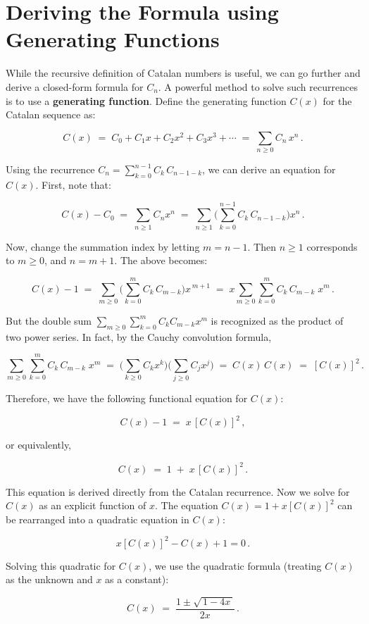 \documentclass[docmute]{article}
\begin{document}
\section{Deriving the Formula using Generating Functions}

While the recursive definition of Catalan numbers is useful, we can go further and derive a closed-form formula for $C_n$. A powerful method to solve such recurrences is to use a \textbf{generating function}. Define the generating function $C(x)$ for the Catalan sequence as:

\[
C(x) \;=\; C_0 + C_1 x + C_2 x^2 + C_3 x^3 + \cdots \;=\; \sum_{n\ge 0} C_n \, x^n\,.
\]

Using the recurrence $C_n = \sum_{k=0}^{n-1} C_k\,C_{n-1-k}$, we can derive an equation for $C(x)$. First, note that:

\[
C(x) - C_0 \;=\; \sum_{n\ge 1} C_n x^n \;=\; \sum_{n\ge 1}\Big(\sum_{k=0}^{n-1} C_k\,C_{n-1-k}\Big) x^n\,.
\]

Now, change the summation index by letting $m = n-1$. Then $n\ge 1$ corresponds to $m \ge 0$, and $n = m+1$. The above becomes:

\[
C(x) - 1 \;=\; \sum_{m\ge 0} \Big(\sum_{k=0}^{m} C_k\,C_{m-k}\Big) x^{\,m+1} \;=\; x \sum_{m\ge 0} \sum_{k=0}^{m} C_k\,C_{m-k}\; x^m\,.
\]

But the double sum $\sum_{m\ge 0}\sum_{k=0}^{m} C_k C_{m-k} x^m$ is recognized as the product of two power series. In fact, by the Cauchy convolution formula, 

\[
\sum_{m\ge 0}\sum_{k=0}^{m} C_k\,C_{m-k}\; x^m \;=\; \Big(\sum_{k\ge 0} C_k x^k\Big)\Big(\sum_{j\ge 0} C_j x^j\Big) \;=\; C(x)\,C(x) \;=\; [C(x)]^2\,.
\]

Therefore, we have the following functional equation for $C(x)$:

\[
C(x) - 1 \;=\; x\,[C(x)]^2\,,
\] 

or equivalently,

\[
C(x) \;=\; 1 \;+\; x\,[C(x)]^2\,.
\]

This equation is derived directly from the Catalan recurrence. Now we solve for $C(x)$ as an explicit function of $x$. The equation $C(x) = 1 + x[C(x)]^2$ can be rearranged into a quadratic equation in $C(x)$:

\[
x [C(x)]^2 - C(x) + 1 = 0\,.
\]

Solving this quadratic for $C(x)$, we use the quadratic formula (treating $C(x)$ as the unknown and $x$ as a constant):

\[
C(x) \;=\; \frac{1 \pm \sqrt{\,1 - 4x\,}}{2x}\,. 
\]
\end{document}

